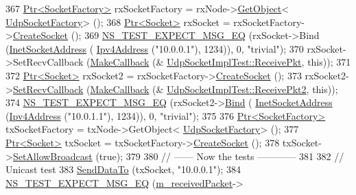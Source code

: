 \begin{DoxyCode}
367   \hyperlink{classns3_1_1Ptr}{Ptr<SocketFactory>} rxSocketFactory = rxNode->\hyperlink{classns3_1_1Object_a13e18c00017096c8381eb651d5bd0783}{GetObject}<
      \hyperlink{classns3_1_1UdpSocketFactory}{UdpSocketFactory}> ();
368   \hyperlink{classns3_1_1Ptr}{Ptr<Socket>} rxSocket = rxSocketFactory->\hyperlink{classns3_1_1SocketFactory_a97351e6e7860503a4912042530449f62}{CreateSocket} ();
369   \hyperlink{group__testing_ga7304ba46a28d8cf08dfdfd6499cf7068}{NS\_TEST\_EXPECT\_MSG\_EQ} (rxSocket->Bind (\hyperlink{classns3_1_1InetSocketAddress}{InetSocketAddress} (
      \hyperlink{classns3_1_1Ipv4Address}{Ipv4Address} (\textcolor{stringliteral}{"10.0.0.1"}), 1234)), 0, \textcolor{stringliteral}{"trivial"});
370   rxSocket->SetRecvCallback (\hyperlink{group__makecallbackmemptr_ga9376283685aa99d204048d6a4b7610a4}{MakeCallback} (&
      \hyperlink{classUdpSocketImplTest_ac01935324b65cb16be8f50eadcfaa8b9}{UdpSocketImplTest::ReceivePkt}, \textcolor{keyword}{this}));
371 
372   \hyperlink{classns3_1_1Ptr}{Ptr<Socket>} rxSocket2 = rxSocketFactory->\hyperlink{classns3_1_1SocketFactory_a97351e6e7860503a4912042530449f62}{CreateSocket} ();
373   rxSocket2->\hyperlink{classns3_1_1Socket_a243f7835ef1a85f9270fd3577e3a40da}{SetRecvCallback} (\hyperlink{group__makecallbackmemptr_ga9376283685aa99d204048d6a4b7610a4}{MakeCallback} (&
      \hyperlink{classUdpSocketImplTest_a6b44ac203ae4bf29c962a7d552b2c4aa}{UdpSocketImplTest::ReceivePkt2}, \textcolor{keyword}{this}));
374   \hyperlink{group__testing_ga7304ba46a28d8cf08dfdfd6499cf7068}{NS\_TEST\_EXPECT\_MSG\_EQ} (rxSocket2->\hyperlink{classns3_1_1Socket_ada93439a43de2028b5a8fc6621dad482}{Bind} (
      \hyperlink{classns3_1_1InetSocketAddress}{InetSocketAddress} (\hyperlink{classns3_1_1Ipv4Address}{Ipv4Address} (\textcolor{stringliteral}{"10.0.1.1"}), 1234)), 0, \textcolor{stringliteral}{"trivial"});
375 
376   \hyperlink{classns3_1_1Ptr}{Ptr<SocketFactory>} txSocketFactory = txNode->GetObject<
      \hyperlink{classns3_1_1UdpSocketFactory}{UdpSocketFactory}> ();
377   \hyperlink{classns3_1_1Ptr}{Ptr<Socket>} txSocket = txSocketFactory->\hyperlink{classns3_1_1Socket_ad448a62bb50ad3dbac59c879a885a8d2}{CreateSocket} ();
378   txSocket->\hyperlink{classns3_1_1Socket_a32b4fa27b732a63207c8d9054a817ed5}{SetAllowBroadcast} (\textcolor{keyword}{true});
379 
380   \textcolor{comment}{// ------ Now the tests ------------}
381 
382   \textcolor{comment}{// Unicast test}
383   \hyperlink{classUdpSocketImplTest_a6d164a214837efedad2b6aa32a9fad0e}{SendDataTo} (txSocket, \textcolor{stringliteral}{"10.0.0.1"});
384   \hyperlink{group__testing_ga7304ba46a28d8cf08dfdfd6499cf7068}{NS\_TEST\_EXPECT\_MSG\_EQ} (\hyperlink{classUdpSocketImplTest_a991dccdef830885aab315ac9ee3c4a06}{m\_receivedPacket}->

\end{DoxyCode}

